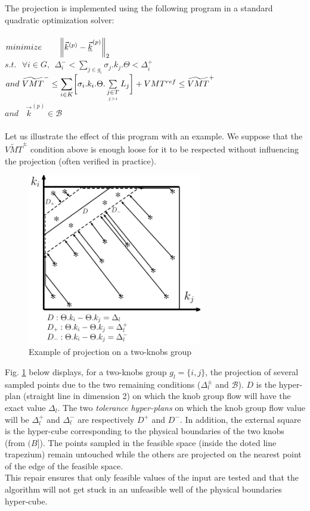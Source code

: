 The projection is implemented using the following program in a standard quadratic optimization solver:\\
\\
$minimize \ \ \ \ \ \ \norm{\vec{k}^{(p)}-\underline{\vec{k}}^{(p)}}_{2}$\\
$s.t.\ \ \ \forall i\in{G}, \ \ \Delta_{i}^{-}< \sum_{j\in{g_{i}}} \sigma_{j}.k_{j}.\Theta<\Delta_{i}^{+}$\\
$and\ \widetilde{VMT}^{-}\leq\mathlarger{\sum\limits_{i\in K}}\biggl[\sigma_{i}.k_{i}.\Theta.	\sum\limits_{\underset{j>i}{j\in T}}L_{j}\biggr]+VMT^{ref}\leq \widetilde{VMT}^{+}\nonumber $\\
$and\ \ \ \ \vec{k}^{(p)}\in \mathscr{B}$\\
\\
Let us illustrate the effect of this program with an example. We suppose that the $\widetilde{VMT}^{\pm}$ condition above is enough loose for it to be respected without influencing the projection (often verified in practice).
\begin{figure}[h!]
\centering
\includegraphics[width=3in]{figures/proj.pdf}
\caption{Example of projection on a two-knobs group}
\label{fig:proj}
\end{figure}
Fig. \ref{fig:proj} below displays, for a two-knobs group $g_{l}=\{i,j\}$, the projection of several sampled points due to the two remaining conditions ($\Delta_{l}^{\pm}$ and $\mathscr{B}$). $D$ is the hyper-plan (straight line in dimension 2) on which the knob group flow will have the exact value $\Delta_{l}$.
The two \emph{tolerance hyper-plans} on which the knob group flow value will be $\Delta_{l}^{+}$ and $\Delta_{l}^{-}$ are respectively $D^{+}$ and $D^{-}$.
In addition, the external square is the hyper-cube corresponding to the physical boundaries of the two knobs (from $\mathscr(B]$). 
The points sampled in the feasible space (inside the doted line trapezium) remain untouched while the others are projected on the nearest point of the edge of the feasible space.\\
This repair ensures that only feasible values of the input are tested and that the algorithm will not get stuck in an unfeasible well of the physical boundaries hyper-cube.\\

